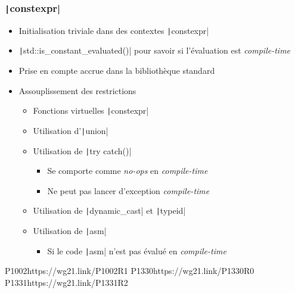 \documentclass[C++.tex]{subfiles}
\begin{document}
\begin{frame}[fragile]
	\frametitle{\texttt|constexpr|}
	\begin{itemize}
		\item Initialisation triviale dans des contextes \texttt|constexpr|
		\item \texttt|std::is_constant_evaluated()| pour savoir si l'évaluation est \textit{compile-time}
		\item Prise en compte accrue dans la bibliothèque standard
		\item Assouplissement des restrictions
		\begin{itemize}
			\item Fonctions virtuelles \texttt|constexpr|
			\item Utilisation d'\texttt|union|
			\item Utilisation de \texttt|try {} catch()|
			\begin{itemize}
				\item Se comporte comme \textit{no-ops} en \textit{compile-time}
				\item Ne peut pas lancer d'exception \textit{compile-time}
			\end{itemize}
			\item Utilisation de \texttt|dynamic_cast| et \texttt|typeid|
			\item Utilisation de \texttt|asm|
			\begin{itemize}
				\item Si le code \texttt|asm| n'est pas évalué en \textit{compile-time}

			\end{itemize}
		\end{itemize}
	\end{itemize}

		{P1002}{https://wg21.link/P1002R1}
		{P1330}{https://wg21.link/P1330R0}
		{P1331}{https://wg21.link/P1331R2}
\end{frame}
\end{document}
